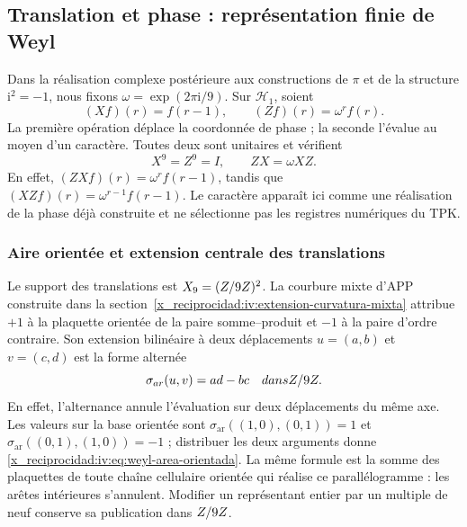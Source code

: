 \subsection{Translation et phase : représentation finie de Weyl}

Dans la réalisation complexe postérieure aux constructions de \(\pi\) et de la structure \(\mathrm i^2=-1\), nous fixons \(\omega=\exp(2\pi\mathrm i/9)\). Sur \(\mathcal H_1\), soient
\begin{equation}
 (Xf)(r)=f(r-1),\qquad (Zf)(r)=\omega^r f(r).
 \label{x_reciprocidad:iv:eq:weyl-operadores}
\end{equation}
La première opération déplace la coordonnée de phase ; la seconde
l’évalue au moyen d’un caractère. Toutes deux sont unitaires et vérifient
\begin{equation}
 X^9=Z^9=I,\qquad ZX=\omega XZ.
 \label{x_reciprocidad:iv:eq:weyl-relacion}
\end{equation}
En effet, \((ZXf)(r)=\omega^r f(r-1)\), tandis que \((XZf)(r)=\omega^{r-1}f(r-1)\). Le caractère apparaît ici comme une réalisation de la phase déjà construite et ne sélectionne pas les registres numériques du TPK.

\subsubsection{Aire orientée et extension centrale des translations}
\label{x_reciprocidad:iv:weyl-area-extension}

Le support des translations est \(X_9=(Z/9Z)^2\).
La courbure mixte d’APP construite dans la
section~\ref{x_reciprocidad:iv:extension-curvatura-mixta} attribue \(+1\) à la
plaquette orientée de la paire somme--produit et \(-1\) à la
paire d’ordre contraire. Son extension bilinéaire à deux déplacements
\(u=(a,b)\) et \(v=(c,d)\) est la forme alternée
\begin{equation}
 \sigma_{\mathrm{ar}}(u,v)=ad-bc\quad\text{dans }\ZZ/9\ZZ.
 \label{x_reciprocidad:iv:eq:weyl-area-orientada}
\end{equation}
En effet, l’alternance annule l’évaluation sur deux déplacements
du même axe. Les valeurs sur la base orientée sont
\(\sigma_{\mathrm{ar}}((1,0),(0,1))=1\) et
\(\sigma_{\mathrm{ar}}((0,1),(1,0))=-1\) ; distribuer les deux
arguments donne \eqref{x_reciprocidad:iv:eq:weyl-area-orientada}. La même formule est
la somme des plaquettes de toute chaîne cellulaire orientée qui réalise
ce parallélogramme : les arêtes intérieures s’annulent. Modifier un
représentant entier par un multiple de neuf conserve sa publication
dans \(Z/9Z\).


